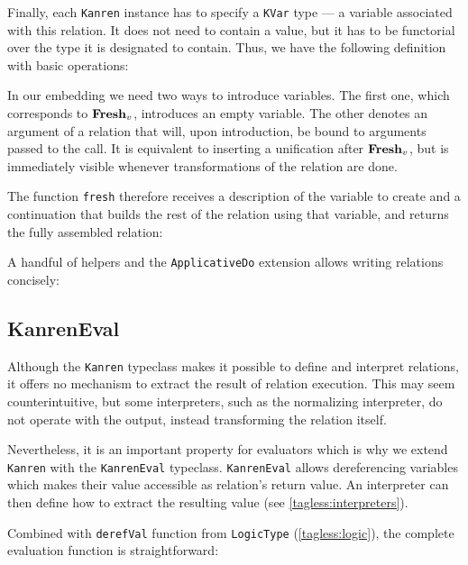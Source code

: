 Finally, each \lstinline{Kanren} instance has to specify a \lstinline{KVar} type --- a variable associated with this relation. 
It does not need to contain a value, but it has to be functorial over the type it is designated to contain.
Thus, we have the following definition with basic \mk operations:


In our embedding we need two ways to introduce variables. 
The first one, which corresponds to $\operatorname{\mathbf{Fresh}}_{v}$, introduces an empty variable. 
The other denotes an argument of a relation that will, upon introduction, be bound to arguments passed to the call. 
It is equivalent to inserting a unification after $\operatorname{\mathbf{Fresh}}_{v}$, but is immediately visible whenever transformations of the relation are done.


The function \lstinline{fresh} therefore receives a description of the variable to create and a continuation that builds the rest of the relation using that variable, and returns the fully assembled relation: 


A handful of helpers and the \lstinline{ApplicativeDo} \haskell extension allows writing relations concisely: 

\subsection{KanrenEval}
\label{tagless:eval}

Although the \lstinline{Kanren} typeclass makes it possible to define and interpret relations, it offers no mechanism to extract the result of relation execution. 
This may seem counterintuitive, but some interpreters, such as the normalizing interpreter, do not operate with the output, instead transforming the relation itself. 

Nevertheless, it is an important property for evaluators which is why we extend \lstinline{Kanren} with the \lstinline{KanrenEval} typeclass. 
\lstinline{KanrenEval} allows dereferencing variables which makes their value accessible as relation's return value.
An interpreter can then define how to extract the resulting value (see \ref{tagless:interpreters}).


Combined with \lstinline{derefVal} function from \lstinline{LogicType} (\ref{tagless:logic}), the complete evaluation function is straightforward: 

